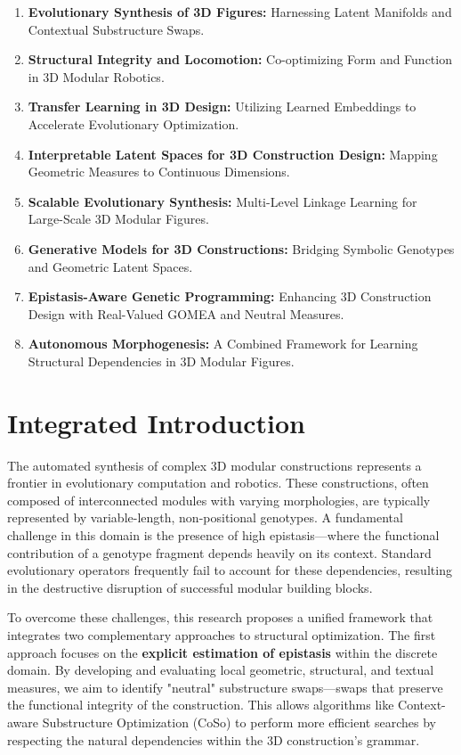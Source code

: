 \documentclass[12pt,a4paper]{article}
\begin{document}
\begin{enumerate}
    \item \textbf{Evolutionary Synthesis of 3D Figures:} Harnessing Latent Manifolds and Contextual Substructure Swaps.
    \item \textbf{Structural Integrity and Locomotion:} Co-optimizing Form and Function in 3D Modular Robotics.
    \item \textbf{Transfer Learning in 3D Design:} Utilizing Learned Embeddings to Accelerate Evolutionary Optimization.
    \item \textbf{Interpretable Latent Spaces for 3D Construction Design:} Mapping Geometric Measures to Continuous Dimensions.
    \item \textbf{Scalable Evolutionary Synthesis:} Multi-Level Linkage Learning for Large-Scale 3D Modular Figures.
    \item \textbf{Generative Models for 3D Constructions:} Bridging Symbolic Genotypes and Geometric Latent Spaces.
    \item \textbf{Epistasis-Aware Genetic Programming:} Enhancing 3D Construction Design with Real-Valued GOMEA and Neutral Measures.
    \item \textbf{Autonomous Morphogenesis:} A Combined Framework for Learning Structural Dependencies in 3D Modular Figures.
\end{enumerate}

\section{Integrated Introduction}

The automated synthesis of complex 3D modular constructions represents a frontier in evolutionary computation and robotics. These constructions, often composed of interconnected modules with varying morphologies, are typically represented by variable-length, non-positional genotypes. A fundamental challenge in this domain is the presence of high epistasis—where the functional contribution of a genotype fragment depends heavily on its context. Standard evolutionary operators frequently fail to account for these dependencies, resulting in the destructive disruption of successful modular building blocks.

To overcome these challenges, this research proposes a unified framework that integrates two complementary approaches to structural optimization. The first approach focuses on the \textbf{explicit estimation of epistasis} within the discrete domain. By developing and evaluating local geometric, structural, and textual measures, we aim to identify "neutral" substructure swaps—swaps that preserve the functional integrity of the construction. This allows algorithms like Context-aware Substructure Optimization (CoSo) to perform more efficient searches by respecting the natural dependencies within the 3D construction's grammar.
\end{document}
